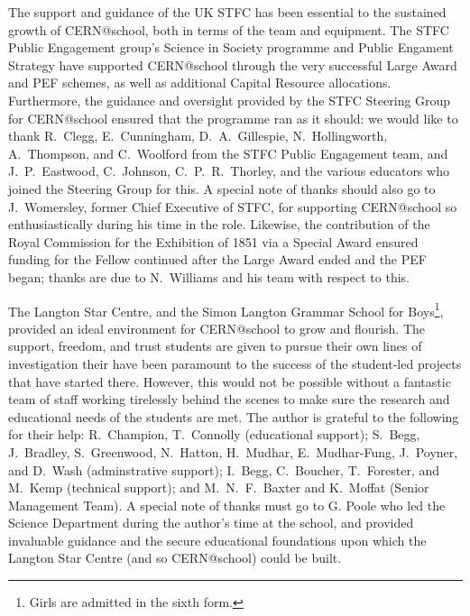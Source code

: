 The support and guidance of the UK \acf{STFC} has been essential to
the sustained growth of CERN@school, both in terms of the team and
equipment. The \acs{STFC} Public Engagement group's
Science in Society programme and Public Engament Strategy
have supported CERN@school through the very successful Large Award and
\acf{PEF} schemes, as well as additional
Capital Resource allocations.
Furthermore, the guidance and oversight provided by the
\acs{STFC} Steering Group for CERN@school ensured that the programme
ran as it should:
we would like to thank
R.~Clegg,
E.~Cunningham,
D.~A.~Gillespie,
N.~Hollingworth,
A.~Thompson,
and
C.~Woolford
from the \acs{STFC} Public Engagement team,
and
J.~P.~Eastwood,
C.~Johnson, %
C.~P.~R.~Thorley,
and the various educators who joined the Steering Group for this.
A special note of thanks should also go to
J.~Womersley, %
former Chief Executive of \acs{STFC}, %
for supporting CERN@school so enthusiastically during his time in the role.
%
Likewise, the contribution of the
Royal Commission for the Exhibition of 1851 via a Special Award
ensured funding for the Fellow continued after the Large Award ended and
the \ac{PEF} began; thanks are due to N.~Williams and
his team with respect to this.

The Langton Star Centre,
and the Simon Langton Grammar School for Boys\footnote{%
Girls are admitted in the sixth form.},
provided an ideal environment for CERN@school to grow and flourish.
%
The support, freedom, and trust students are given to pursue their own
lines of investigation their have been paramount to the success of the
student-led projects that have started there.
However, this would not be possible without a fantastic team of
staff working tirelessly behind the scenes to make sure the
research and educational needs of the students are met.
The author is grateful to the following for their help:
R.~Champion, T.~Connolly (educational support);
S.~Begg, J.~Bradley, S.~Greenwood,
N.~Hatton, H.~Mudhar, E.~Mudhar-Fung,
J.~Poyner, and D.~Wash (adminstrative support);
I.~Begg, C.~Boucher, T.~Forester, and M.~Kemp (technical support);
and
M.~N.~F.~Baxter and K.~Moffat (Senior Management Team).
%
A special note of thanks must go to G. Poole who led the
Science Department during the author's time at the school,
and provided invaluable guidance and the secure educational
foundations upon which the Langton Star Centre (and so CERN@school)
could be built.

